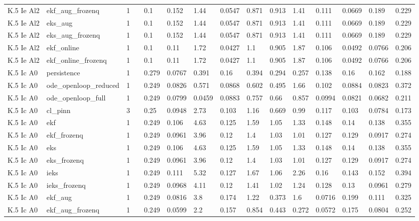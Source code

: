 \begin{table}[t]
\begin{tabular}{lllllllllllllll}
K.5 Ie Al2 & ekf\_aug\_frozenq & 1 &  & 0.1 & 0.152 & 1.44 & 0.0547 & 0.871 & 0.913 & 1.41 & 0.111 & 0.0669 & 0.189 & 0.229 \\
K.5 Ie Al2 & eks\_aug & 1 &  & 0.1 & 0.152 & 1.44 & 0.0547 & 0.871 & 0.913 & 1.41 & 0.111 & 0.0669 & 0.189 & 0.229 \\
K.5 Ie Al2 & eks\_aug\_frozenq & 1 &  & 0.1 & 0.152 & 1.44 & 0.0547 & 0.871 & 0.913 & 1.41 & 0.111 & 0.0669 & 0.189 & 0.229 \\
K.5 Ie Al2 & ekf\_online & 1 &  & 0.1 & 0.11 & 1.72 & 0.0427 & 1.1 & 0.905 & 1.87 & 0.106 & 0.0492 & 0.0766 & 0.206 \\
K.5 Ie Al2 & ekf\_online\_frozenq & 1 &  & 0.1 & 0.11 & 1.72 & 0.0427 & 1.1 & 0.905 & 1.87 & 0.106 & 0.0492 & 0.0766 & 0.206 \\
K.5 Ic A0 & persistence & 1 &  & 0.279 & 0.0767 & 0.391 & 0.16 & 0.394 & 0.294 & 0.257 & 0.138 & 0.16 & 0.162 & 0.188 \\
K.5 Ic A0 & ode\_openloop\_reduced & 1 &  & 0.249 & 0.0826 & 0.571 & 0.0868 & 0.602 & 0.495 & 1.66 & 0.102 & 0.0884 & 0.0823 & 0.372 \\
K.5 Ic A0 & ode\_openloop\_full & 1 &  & 0.249 & 0.0799 & 0.0459 & 0.0883 & 0.757 & 0.66 & 0.857 & 0.0994 & 0.0821 & 0.0682 & 0.211 \\
K.5 Ic A0 & cl\_pinn & 3 &  & 0.25 & 0.0948 & 2.73 & 0.103 & 1.16 & 0.669 & 0.99 & 0.117 & 0.103 & 0.0784 & 0.173 \\
K.5 Ic A0 & ekf & 1 &  & 0.249 & 0.106 & 4.63 & 0.125 & 1.59 & 1.05 & 1.33 & 0.148 & 0.14 & 0.138 & 0.355 \\
K.5 Ic A0 & ekf\_frozenq & 1 &  & 0.249 & 0.0961 & 3.96 & 0.12 & 1.4 & 1.03 & 1.01 & 0.127 & 0.129 & 0.0917 & 0.274 \\
K.5 Ic A0 & eks & 1 &  & 0.249 & 0.106 & 4.63 & 0.125 & 1.59 & 1.05 & 1.33 & 0.148 & 0.14 & 0.138 & 0.355 \\
K.5 Ic A0 & eks\_frozenq & 1 &  & 0.249 & 0.0961 & 3.96 & 0.12 & 1.4 & 1.03 & 1.01 & 0.127 & 0.129 & 0.0917 & 0.274 \\
K.5 Ic A0 & ieks & 1 &  & 0.249 & 0.111 & 5.32 & 0.127 & 1.67 & 1.06 & 2.26 & 0.16 & 0.143 & 0.152 & 0.394 \\
K.5 Ic A0 & ieks\_frozenq & 1 &  & 0.249 & 0.0968 & 4.11 & 0.12 & 1.41 & 1.02 & 1.24 & 0.128 & 0.13 & 0.0961 & 0.279 \\
K.5 Ic A0 & ekf\_aug & 1 &  & 0.249 & 0.0816 & 3.8 & 0.174 & 1.22 & 0.373 & 1.6 & 0.0716 & 0.199 & 0.111 & 0.325 \\
K.5 Ic A0 & ekf\_aug\_frozenq & 1 &  & 0.249 & 0.0599 & 2.2 & 0.157 & 0.854 & 0.443 & 0.272 & 0.0572 & 0.175 & 0.0804 & 0.252 \\

\end{tabular}
\end{table}
